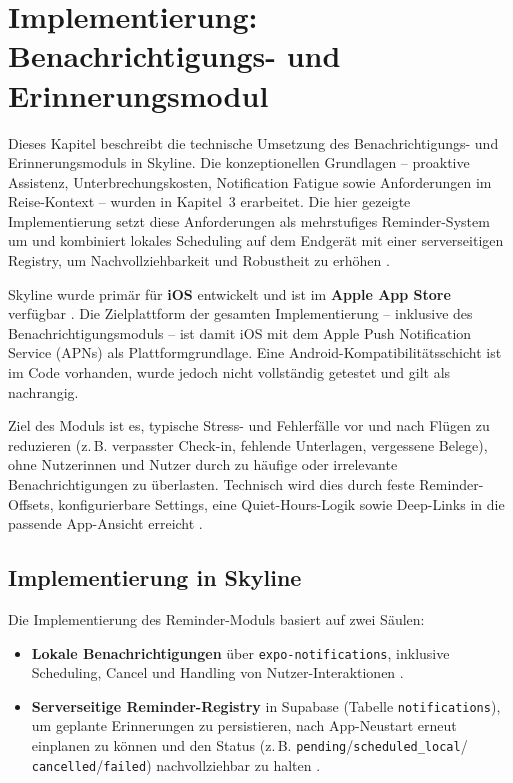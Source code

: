 
\chapter{Implementierung: Benachrichtigungs- und Erinnerungsmodul}
\label{chapter:notifications}

Dieses Kapitel beschreibt die technische Umsetzung des Benachrichtigungs- und
Erinnerungsmoduls in Skyline.
Die konzeptionellen Grundlagen -- proaktive Assistenz, Unterbrechungskosten, Notification
Fatigue sowie Anforderungen im Reise-Kontext -- wurden in Kapitel~3 erarbeitet.
Die hier gezeigte Implementierung setzt diese Anforderungen als mehrstufiges Reminder-System
um und kombiniert lokales Scheduling auf dem Endgerät mit einer serverseitigen Registry,
um Nachvollziehbarkeit und Robustheit zu erhöhen
\cite{ozdemir2025echoes,visuri2019notifications}.

Skyline wurde primär für \textbf{iOS} entwickelt und ist im \textbf{Apple App Store} verfügbar \cite{appleLocalNotif}.
Die Zielplattform der gesamten Implementierung -- inklusive des Benachrichtigungsmoduls --
ist damit iOS mit dem Apple Push Notification Service (APNs) als Plattformgrundlage.
Eine Android-Kompatibilitätsschicht ist im Code vorhanden, wurde jedoch nicht vollständig
getestet und gilt als nachrangig.

Ziel des Moduls ist es, typische Stress- und Fehlerfälle vor und nach Flügen zu reduzieren
(z.\,B. verpasster Check-in, fehlende Unterlagen, vergessene Belege), ohne Nutzerinnen und
Nutzer durch zu häufige oder irrelevante Benachrichtigungen zu überlasten.
Technisch wird dies durch feste Reminder-Offsets, konfigurierbare Settings, eine
Quiet-Hours-Logik sowie Deep-Links in die passende App-Ansicht erreicht
\cite{ozdemir2025echoes,reactNavDeepLink}.

\section{Implementierung in Skyline}
\label{sec:notifications-implementation}

Die Implementierung des Reminder-Moduls basiert auf zwei Säulen:

\begin{itemize}
  \item \textbf{Lokale Benachrichtigungen} über \texttt{expo-notifications}, inklusive
        Scheduling, Cancel und Handling von Nutzer-Interaktionen
        \cite{expoNotificationsSDK,expoHandleIncoming}.
  \item \textbf{Serverseitige Reminder-Registry} in Supabase (Tabelle \texttt{notifications}),
        um geplante Erinnerungen zu persistieren, nach App-Neustart erneut einplanen zu
        können und den Status (z.\,B. \texttt{pending}/\texttt{scheduled\_local}/
        \texttt{cancelled}/\texttt{failed}) nachvollziehbar zu halten
        \cite{supabaseRLS,supabaseSecuringApi}.
\end{itemize}

